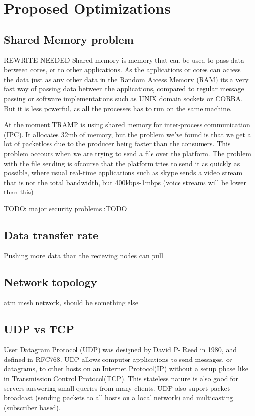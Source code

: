 \section{Proposed Optimizations}
\label{sec:optimizations}

\subsection{Shared Memory problem}
REWRITE NEEDED
Shared memory is memory that can be used to pass data between cores, or to other applications. As the applications or cores can access the data just as any other data in the Random Access Memory (RAM) its a very fast way of passing data between the applications, compared to regular message passing or software implementations such as UNIX domain sockets or CORBA. But it is less powerful, as all the processes has to run on the same machine.\cite{shared_memory}

At the moment TRAMP is using shared memory for inter-process communication (IPC). It allocates 32mb of memory, but the problem we've found is that we get a lot of packetloss due to the producer being faster than the consumers. This problem occours when we are trying to send a file over the platform. The problem with the file sending is ofcourse that the platform tries to send it as quickly as possible, where usual real-time applications such as skype sends a video stream that is not the total bandwidth, but 400kbps-1mbps (voice streams will be lower than this).


TODO: major security problems :TODO

\subsection{Data transfer rate}
Pushing more data than the recieving nodes can pull

\subsection{Network topology}
atm mesh network, should be something else

\subsection{UDP vs TCP}
User Datagram Protocol (UDP) was designed by David P- Reed in 1980, and defined in RFC768. UDP allows computer applications to send messages, or datagrams, to other hosts on an Internet Protocol(IP) without a setup phase like in Transmission Control Protocol(TCP). This stateless nature is also good for servers answering small queries from many clients. UDP also suport packet broadcast (sending packets to all hosts on a local network) and multicasting (subscriber based).

